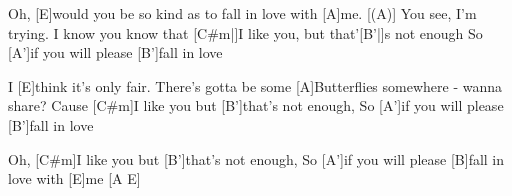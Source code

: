 \begin{guitar}
	\begin{highlightbar}
		Oh, [E]would you be so kind as to fall in love with [A]me.
		[(A)] You see, I'm trying. I know you know that 
		[C#m|]{I }like you, but that'[B'|]{s }not enough
		So [A']if you will please [B']fall in love
		
		I [E]think it's only fair. There's gotta be some 
		[A]Butterflies somewhere - wanna share?
		Cause [C#m]I like you but [B']that's not enough,
		So [A']if you will please [B']fall in love
		
		Oh, [C#m]I like you but [B']that's not enough,
		So [A']if you will please [B]fall in love with [E]me [A E]{}
	\end{highlightbar}
\end{guitar}